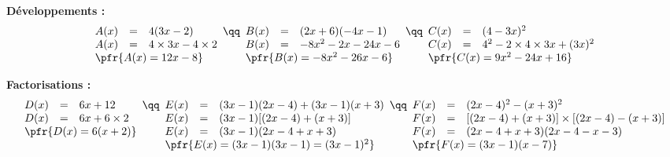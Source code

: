 \documentclass[french,10pt]{article}
\newcommand\Resultat[1]{%
\multicolumn{3}{l}{\pfr{#1}}%
}
\begin{document}
\dotfill\bigskip

\begin{center}
	\textbf{}
\end{center}

\textbf{Développements :}
\[
\begin{array}[t]{rcl}
	A(x) & = & 4(3x - 2) \\
	A(x) & = & 4 \times 3x - 4 \times 2 \\
	\Resultat{A(x) = 12x - 8}
\end{array}
\qq
\begin{array}[t]{rcl}
	B(x) & = & (2x + 6)(-4x - 1) \\
	B(x) & = & -8x^2 - 2x - 24x - 6 \\
	\Resultat{B(x) = -8x^2 - 26x - 6}
\end{array}
\qq
\begin{array}[t]{rcl}
	C(x) & = & (4 - 3x)^2 \\
	C(x) & = & 4^2 - 2 \times 4 \times 3x + (3x)^2\\
	\Resultat{C(x) = 9x^2 - 24x + 16}
\end{array}
\]

\textbf{Factorisations :}
\[
\begin{array}[t]{rcl}
	D(x) & = & 6x + 12 \\
	D(x) & = & 6x + 6 \times 2 \\
	\Resultat{D(x) = 6(x + 2)}
\end{array}
\qq
\begin{array}[t]{rcl}
	E(x) & = & (3x - 1)(2x - 4) + (3x - 1)(x + 3) \\
	E(x) & = & (3x - 1)[(2x - 4) + (x + 3)] \\
	E(x) & = & (3x - 1)(2x - 4 + x + 3) \\
	\Resultat{E(x) = (3x - 1)(3x - 1) = (3x - 1)^2}
\end{array}
\qq
\begin{array}[t]{rcl}
	F(x) & = & (2x - 4)^2 - (x + 3)^2 \\
	F(x) & = & [(2x - 4) + (x + 3)] \times [(2x - 4) - (x + 3)] \\
	F(x) & = & (2x - 4 + x + 3)(2x - 4 - x - 3) \\
	\Resultat{F(x) = (3x - 1)(x - 7)}
\end{array}
\]
\end{document}

